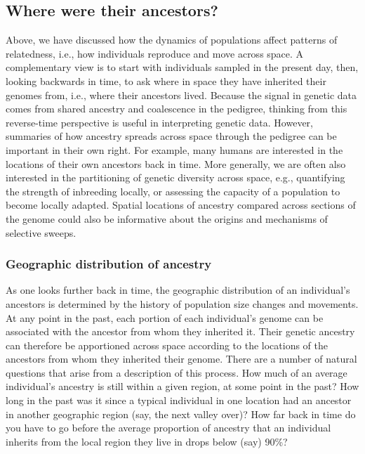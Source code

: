 \documentclass{ar-1col}
\newcommand{\todo}[1]{{\textbf{\color{red}{#1}}}}
\begin{document}
\todo{$m$ between "discrete pops", resistance distance.
methods: scat, ringbauer2018, ralphcoop, cayuela refs, cockerhaweir1993, eems, newEems, bedassle, duforet-frebourg and blum}

\subsection{Where were their ancestors?}

Above, we have discussed how the dynamics of populations affect
patterns of relatedness,
i.e., how individuals reproduce and move across space.
A complementary view is to
start with individuals sampled in the present day,
then, looking backwards in time,
to ask where in space they have inherited their genomes from, 
i.e., where their ancestors lived.
Because the signal in genetic data comes from 
shared ancestry and coalescence in the pedigree,
thinking from this reverse-time perspective 
is useful in interpreting genetic data.
However, summaries of how ancestry spreads across space 
through the pedigree can be important in their own right.
For example, many humans are interested
in the locations of their own ancestors back in time.
More generally,
we are often also interested in the partitioning of genetic diversity across space,
e.g.,
quantifying the strength of inbreeding locally,
or assessing the capacity of a population to become locally adapted.
Spatial locations of ancestry compared across sections of the genome
could also be informative about the origins and mechanisms of selective sweeps.


\subsubsection{Geographic distribution of ancestry}

As one looks further back in time,
the geographic distribution of an individual's ancestors
is determined by the history of population size changes and movements.
At any point in the past,
each portion of each individual's genome can be associated 
with the ancestor from whom they inherited it.
Their genetic ancestry can therefore be apportioned across space according
to the locations of the ancestors from whom they inherited their genome.
There are a number of natural questions that arise from a description of this process.
How much of an average individual's ancestry is still within a given region, 
at some point in the past?
How long in the past was it since a typical individual in one location had an ancestor
in another geographic region (say, the next valley over)?
How far back in time do you have to go before 
the average proportion of ancestry that an individual inherits
from the local region they live in drops below (say) 90\%?
\end{document}
